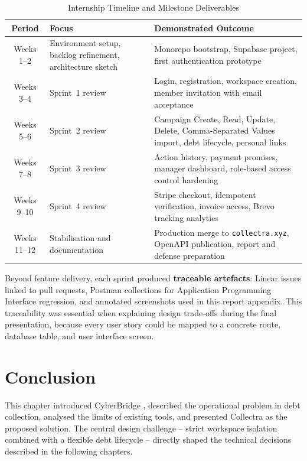 \documentclass[12pt,a4paper]{report}
\newcommand{\reporttablesetup}{%
  \small%
  \setlength{\tabcolsep}{5pt}%
  \renewcommand{\arraystretch}{1.38}%
  \arrayrulecolor{framegray}%
}
\begin{document}
\begin{table}[H]
  \centering
  \reporttablesetup
  \begin{tabularx}{\textwidth}{|c|Y|Z|}
    \hline
    \textbf{Period} & \textbf{Focus} & \textbf{Demonstrated Outcome} \\
    \hline
    Weeks 1--2 & Environment setup, backlog refinement, architecture sketch &
    Monorepo bootstrap, Supabase project, first authentication prototype \\
    \hline
    Weeks 3--4 & Sprint~1 review &
    Login, registration, workspace creation, member invitation with email acceptance \\
    \hline
    Weeks 5--6 & Sprint~2 review &
    Campaign Create, Read, Update, Delete, Comma-Separated Values import, debt lifecycle, personal links \\
    \hline
    Weeks 7--8 & Sprint~3 review &
    Action history, payment promises, manager dashboard, role-based access control hardening \\
    \hline
    Weeks 9--10 & Sprint~4 review &
    Stripe checkout, idempotent verification, invoice access, Brevo tracking analytics \\
    \hline
    Weeks 11--12 & Stabilisation and documentation &
    Production merge to \texttt{collectra.xyz}, OpenAPI publication, report and defense preparation \\
    \hline
  \end{tabularx}
  \caption{Internship Timeline and Milestone Deliverables}
  \label{tab:internship-timeline}
\end{table}

Beyond feature delivery, each sprint produced \textbf{traceable artefacts}: Linear issues
linked to pull requests, Postman collections for Application Programming Interface regression,
and annotated screenshots used in this report appendix.
This traceability was essential when explaining design trade-offs during the final presentation,
because every user story could be mapped to a concrete route, database table, and user interface screen.

\section*{Conclusion}
{}

This chapter introduced CyberBridge , described the operational problem in debt
collection, analysed the limits of existing tools, and presented Collectra as the
proposed solution.
The central design challenge -- strict workspace isolation combined with a flexible
debt lifecycle -- directly shaped the technical decisions described in the following
chapters.
\end{document}
